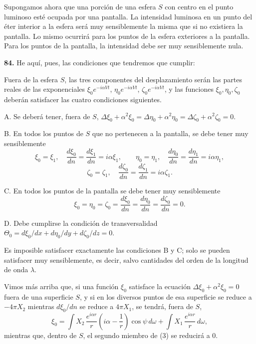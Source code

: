 Supongamos ahora que una porción de una esfera $S$ con centro en el punto
luminoso esté ocupada por una pantalla. La intensidad luminosa en un
punto del éter interior a la esfera será muy sensiblemente la misma que
si no existiera la pantalla. Lo mismo ocurrirá para los puntos de la
esfera exteriores a la pantalla. Para los puntos de la pantalla, la
intensidad debe ser muy sensiblemente nula.

\noindent\textbf{84.} He aquí, pues, las condiciones que tendremos que
cumplir:

Fuera de la esfera $S$, las tres componentes del desplazamiento serán las
partes reales de las exponenciales $\xi_0e^{-i\alpha Vt}$,
$\eta_0e^{-i\alpha Vt}$, $\zeta_0e^{-i\alpha Vt}$, y las funciones
$\xi_0,\eta_0,\zeta_0$ deberán satisfacer las cuatro condiciones
siguientes.

A. Se deberá tener, fuera de $S$,
$\Delta\xi_0+\alpha^2\xi_0=\Delta\eta_0+\alpha^2\eta_0=
\Delta\zeta_0+\alpha^2\zeta_0=0$.

B. En todos los puntos de $S$ que no pertenecen a la pantalla, se debe
tener muy sensiblemente
\[
\xi_0=\xi_1,\quad \frac{d\xi_0}{dn}=\frac{d\xi_1}{dn}=i\alpha\xi_1,\qquad
\eta_0=\eta_1,\quad \frac{d\eta_0}{dn}=\frac{d\eta_1}{dn}=i\alpha\eta_1,
\]
\[
\zeta_0=\zeta_1,\quad \frac{d\zeta_0}{dn}=\frac{d\zeta_1}{dn}=i\alpha\zeta_1.
\]

C. En todos los puntos de la pantalla se debe tener muy sensiblemente
\[
\xi_0=\eta_0=\zeta_0=\frac{d\xi_0}{dn}=\frac{d\eta_0}{dn}=
\frac{d\zeta_0}{dn}=0.
\]

D. Debe cumplirse la condición de transversalidad
$\Theta_0=d\xi_0/dx+d\eta_0/dy+d\zeta_0/dz=0$.

Es imposible satisfacer exactamente las condiciones B y C; solo se pueden
satisfacer muy sensiblemente, es decir, salvo cantidades del orden de la
longitud de onda $\lambda$.

Vimos más arriba que, si una función $\xi_0$ satisface la ecuación
$\Delta\xi_0+\alpha^2\xi_0=0$ fuera de una superficie $S$, y si en los
diversos puntos de esa superficie se reduce a $-4\pi X_2$ mientras
$d\xi_0/dn$ se reduce a $4\pi X_1$, se tendrá, fuera de $S$,
\begin{equation}
\xi_0 = \int X_2\,\frac{e^{i\alpha r}}{r}\left(i\alpha-\frac1r\right)
\cos\psi\,d\omega + \int X_1\,\frac{e^{i\alpha r}}{r}\,d\omega,
\tag{3}
\end{equation}
mientras que, dentro de $S$, el segundo miembro de (3) se reducirá a $0$.

